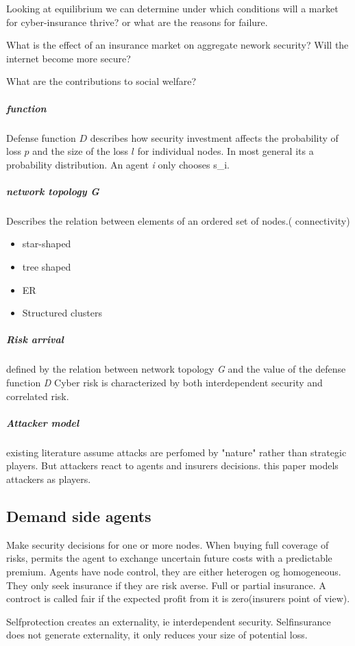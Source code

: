 Looking at equilibrium we can determine under which conditions will a market for cyber-insurance thrive? or what are the reasons for failure.

What is the effect of an insurance market on aggregate nework security? Will the internet become more secure?

What are the contributions to social welfare?

\subparagraph{function}
Defense function \begin{math} D \end{math} describes how security investment affects the probability of loss \begin{math}p \end{math} and the size of the loss  \begin{math}l \end{math} for individual nodes.  In most general its a probability distribution.
An agent \textit{i} only chooses s_i.

\subparagraph{network topology G}
Describes the relation between elements of an ordered set of nodes.( connectivity)
\begin{itemize}[topsep=-1em,parsep=0em,itemsep=0em] 
\item star-shaped \item tree shaped \item ER \item Structured clusters
\end{itemize}
\subparagraph{Risk arrival}
defined by the relation between network topology \textit{G} and the value of the defense
 function \textit{D}
Cyber risk is characterized by both interdependent security and correlated risk.
\subparagraph{Attacker model}
existing literature assume attacks are perfomed by "nature" rather than strategic players.
 But attackers react to agents and insurers decisions. this paper models attackers as
  players. 
\subsection{Demand side agents}
Make security decisions for one or more nodes. When buying full coverage of risks, permits
 the agent to exchange uncertain future costs with a predictable premium. 
Agents have node control, they are either heterogen og homogeneous. They only seek
 insurance if they are risk averse. 
Full or partial insurance. 
A controct is called fair if the expected profit from it is zero(insurers point of view).

Selfprotection creates an externality, ie interdependent security.
Selfinsurance does not generate externality, it only reduces your size of potential loss. 


